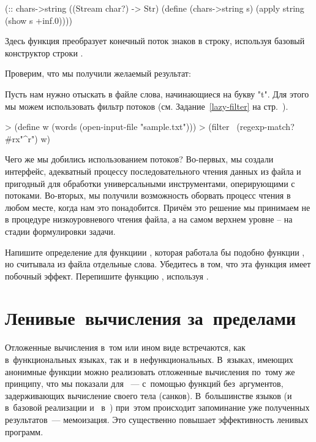 {\begin{Definition}
(:: chars->string ((Stream char?) -> Str)
  (define (chars->string s) 
    (apply string (show s +inf.0))))
\end{Definition}
\newpage
Здесь функция  преобразует конечный поток знаков в строку, используя базовый конструктор строки . 

Проверим, что мы получили желаемый результат:

Пусть нам нужно отыскать в файле слова, начинающиеся на букву "t". Для этого мы можем использовать фильтр потоков  (см. Задание~\ref{lazy-filter} на стр.~\pageref{lazy-filter}).
\begin{SchemeCode}
> (define w (words (open-input-file "sample.txt")))
> (filter~ (regexp-match? #rx"^r") w)
\end{SchemeCode}

Чего же мы добились использованием потоков? Во-первых, мы создали интерфейс, адекватный процессу последовательного чтения данных из файла и пригодный для обработки универсальными инструментами, оперирующими с потоками.
Во-вторых, мы получили возможность оборвать процесс чтения в любом месте, когда нам это понадобится. Причём это решение мы принимаем не в процедуре низкоуровневого чтения файла, а на самом верхнем уровне – на стадии формулировки задачи. 

\begin{Assignment}
Напишите определение для функциии , которая работала бы подобно функции , но считывала из файла отдельные слова. Убедитесь в том, что эта функция имеет побочный эффект. Перепишите функцию , используя .
\end{Assignment}


\section{Ленивые~вычисления за~пределами~\Scheme}%
Отложенные вычисления в~том или ином виде встречаются, как в~функциональных языках, так и~в нефункциональных. В~языках, имеющих анонимные функции можно реализовать отложенные вычисления по~тому же принципу, что мы показали для \Scheme~--- с~помощью функций без~аргументов, задерживающих вычисление своего тела (санков). В~большинстве языков (и в~базовой реализации  и~ в~\Scheme) при~этом происходит запоминание уже полученных результатов~--- мемоизация. Это существенно повышает эффективность ленивых программ.

}
